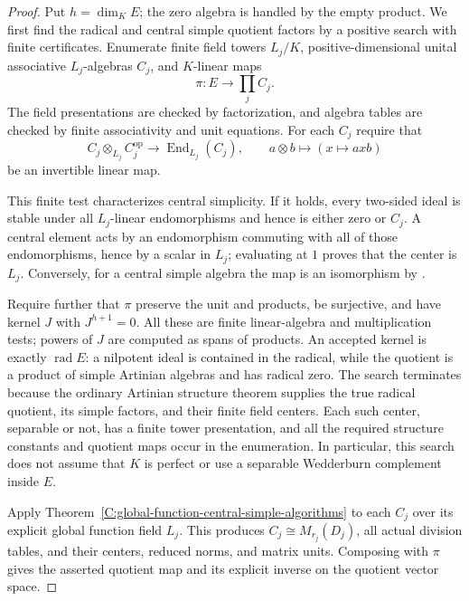 \begin{proof}
Put $h=\dim_KE$; the zero algebra is handled by the empty
product. We first find the radical and central simple
quotient factors by a positive search with finite certificates.
Enumerate finite field towers $L_j/K$, positive-dimensional
unital associative $L_j$-algebras $C_j$, and $K$-linear maps
\[
                         \pi:E\longrightarrow\prod_j C_j.
\]
The field presentations are checked by factorization,
and algebra tables are checked by finite associativity
and unit equations. For each $C_j$ require that
\[
 C_j\otimes_{L_j}C_j^{\mathrm{op}}\longrightarrow
       \operatorname{End}_{L_j}(C_j),
       \qquad a\otimes b\longmapsto(x\mapsto axb)        \tag{C.3.GA4}
\]
be an invertible linear map.

This finite test characterizes central simplicity. If it
holds, every two-sided ideal is stable under all
$L_j$-linear endomorphisms and hence is either zero or
$C_j$. A central element acts by an endomorphism commuting
with all of those endomorphisms, hence by a scalar in
$L_j$; evaluating at $1$ proves that the center is $L_j$.
Conversely, for a central simple algebra the map is an
isomorphism by
\cite[Lemma 11.4.10]{C-StacksGlobalFunctionArithmetic}.

Require further that $\pi$ preserve the unit and products,
be surjective, and have kernel $J$ with $J^{h+1}=0$.
All these are finite linear-algebra and multiplication
tests; powers of $J$ are computed as spans of products.
An accepted kernel is exactly $\operatorname{rad}E$:
a nilpotent ideal is contained in the radical, while the
quotient is a product of simple Artinian algebras and
has radical zero. The search terminates because the
ordinary Artinian structure theorem supplies the true
radical quotient, its simple factors, and their finite
field centers. Each such center, separable or not, has
a finite tower presentation, and all the required
structure constants and quotient maps occur in the
enumeration. In particular, this search does not assume
that $K$ is perfect or use a separable Wedderburn complement
inside $E$.

Apply Theorem~\ref{C:global-function-central-simple-algorithms}
to each $C_j$ over its explicit global function field $L_j$.
This produces $C_j\cong M_{r_j}(D_j)$, all actual division
tables, and their centers, reduced norms, and matrix units.
Composing with $\pi$ gives the asserted quotient map and
its explicit inverse on the quotient vector space.


\end{proof}

